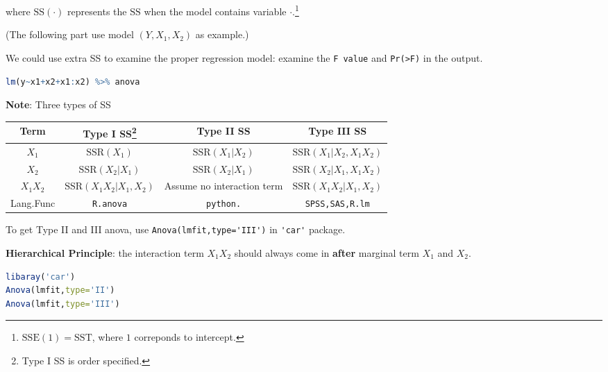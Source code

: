     where $ \mathrm{SS}(\cdot)  $ represents the $ \mathrm{SS} $ when the model contains variable $ \cdot $.\footnote{$ \mathrm{SSE}(1)=\mathrm{SST} $, where $ 1 $ correponds to intercept.}
    
    
    (The following part use model $ (Y,X_1,X_2) $ as example.)


    We could use extra SS to examine the proper regression model: examine the \lstinline|F value| and \lstinline|Pr(>F)| in the output.

\begin{rcode}
\begin{lstlisting}[language=R]
lm(y~x1+x2+x1:x2) %>% anova
\end{lstlisting}
\end{rcode}

    \textbf{Note}: Three types of SS 
\begin{table}[H]
    \centering
    \renewcommand\arraystretch{1.15}
    \begin{tabular}{c|ccc}
        \hline
        Term&Type I SS\footnote{Type I SS is order specified.}&Type II SS&Type III SS\\\hline
        $ X_1 $&$ \mathrm{SSR}(X_1) $&$ \mathrm{SSR}(X_1|X_2)  $&$ \mathrm{SSR}(X_1|X_2,X_1X_2)  $\\
        $ X_2 $&$ \mathrm{SSR}(X_2|X_1) $&$ \mathrm{SSR}(X_2|X_1)  $&$ \mathrm{SSR}(X_2|X_1,X_1X_2)  $\\
        $ X_1X_2 $&$ \mathrm{SSR}(X_1X_2|X_1,X_2) $&Assume no interaction term &$ \mathrm{SSR}(X_1X_2|X_1,X_2)  $\\\hline
        Lang.Func&\lstinline|R.anova|&\lstinline|python.|&\lstinline|SPSS,SAS,R.lm|\\
        \hline
    \end{tabular}
\end{table}

    To get Type II and III anova, use \lstinline|Anova(lmfit,type='III')| in \lstinline|'car'| package.

    \textbf{Hierarchical Principle}: the interaction term $ X_1X_2 $ should always come in \textbf{after}  marginal term $ X_1 $ and $ X_2 $.  

\begin{rcode}
\begin{lstlisting}[language=R]
libaray('car')
Anova(lmfit,type='II')
Anova(lmfit,type='III')
\end{lstlisting}
\end{rcode}






